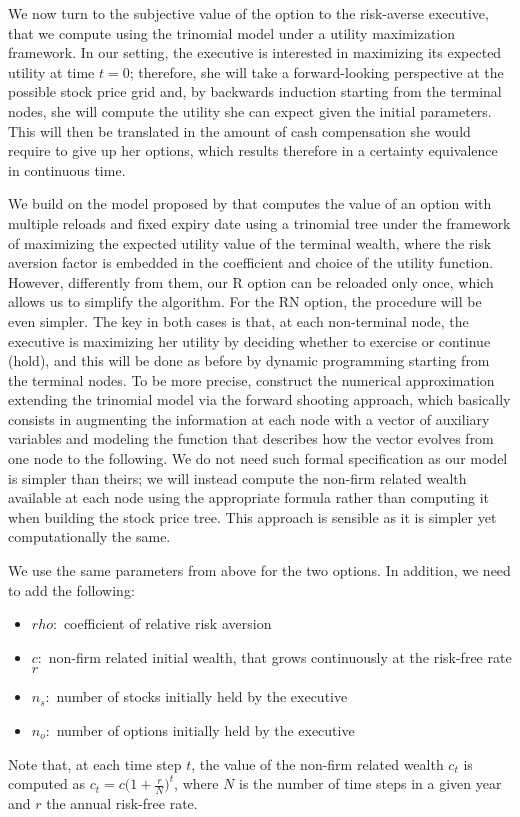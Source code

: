 We now turn to the subjective value of the option to the risk-averse executive, that we compute using the trinomial model under a utility maximization framework. In our setting, the executive is interested in maximizing its expected utility at time $t=0$; therefore, she will take a forward-looking perspective at the possible stock price grid and, by backwards induction starting from the terminal nodes, she will compute the utility she can expect given the initial parameters. This will then be translated in the amount of cash compensation she would require to give up her options, which results therefore in a certainty equivalence in continuous time. 

We build on the model proposed by \cite{lau2005valuation} that computes the value of an option with multiple reloads and fixed expiry date using a trinomial tree under the framework of maximizing the expected utility value of the terminal wealth, where the risk aversion factor is embedded in the coefficient and choice of the utility function. However, differently from them, our R option can be reloaded only once, which allows us to simplify the algorithm. For the RN option, the procedure will be even simpler. The key in both cases is that, at each non-terminal node, the executive is maximizing her utility by deciding whether to exercise or continue (hold), and this will be done as before by dynamic programming starting from the terminal nodes.
To be more precise, \cite{lau2005valuation} construct the numerical approximation extending the trinomial model via the forward shooting approach, which basically consists in augmenting the information at each node with a vector of auxiliary variables and modeling the function that describes how the vector evolves from one node to the following. We do not need such formal specification as our model is simpler than theirs; we will instead compute the non-firm related wealth available at each node using the appropriate formula rather than computing it when building the stock price tree. This approach is sensible as it is simpler yet computationally the same.

We use the same parameters from above for the two options. In addition, we need to add the following: 
\begin{itemize}
    \item $rho: $ coefficient of relative risk aversion
    \item $c: $ non-firm related initial wealth, that grows continuously at the risk-free rate $r$
    \item $n_s: $ number of stocks initially held by the executive
    \item $n_o: $ number of options initially held by the executive
\end{itemize}
Note that, at each time step $t$, the value of the non-firm related wealth $c_t$ is computed as $c_t = c \bigl(1+\frac{r}{N}\bigr)^{t}$, where $N$ is the number of time steps in a given year and $r$ the annual risk-free rate. 


